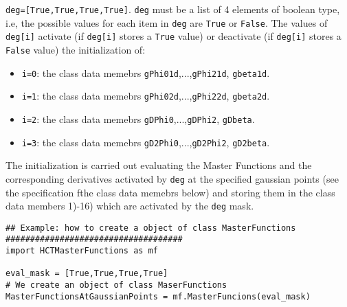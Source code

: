 \documentclass{amsart}
\theoremstyle{plain}
\theoremstyle{definition}
\theoremstyle{remark}
\numberwithin{equation}{section}
\begin{document}
\verb|deg=[True,True,True,True]|. \verb|deg| must be a list of 4 elements of boolean type, i.e, the possible values for each item in \verb|deg| are \verb|True| or \verb|False|. The values of \verb|deg[i]| activate (if \verb|deg[i]| stores a \verb|True| value) or deactivate (if \verb|deg[i]| stores a \verb|False| value) the initialization of:
\begin{itemize}
\item \verb|i=0|: the class data memebrs \verb|gPhi01d|,...,\verb|gPhi21d|, \verb|gbeta1d|.
\item \verb|i=1|: the class data memebrs \verb|gPhi02d|,...,\verb|gPhi22d|, \verb|gbeta2d|.
\item \verb|i=2|: the class data memebrs \verb|gDPhi0|,...,\verb|gDPhi2|, \verb|gDbeta|.
\item \verb|i=3|: the class data memebrs \verb|gD2Phi0|,...,\verb|gD2Phi2|, \verb|gD2beta|.
\end{itemize}
The initialization is carried out evaluating the Master Functions and the corresponding derivatives activated by \verb|deg| at the specified gaussian points (see the specification fthe class data memebrs below) and storing them in the class data members 1)-16) which are activated by the \verb|deg| mask.

\begin{lstlisting}
## Example: how to create a object of class MasterFunctions
####################################
import HCTMasterFunctions as mf

eval_mask = [True,True,True,True]
# We create an object of class MaserFunctions
MasterFunctionsAtGaussianPoints = mf.MasterFuncions(eval_mask)
\end{lstlisting}
\end{document}
